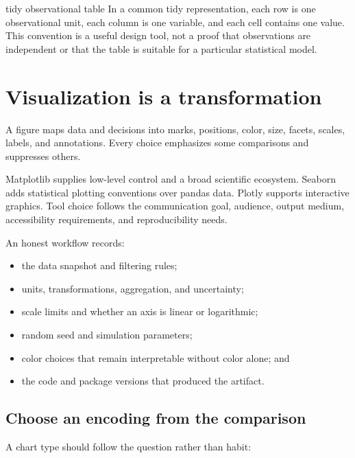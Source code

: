 \begin{definitionbox}{tidy observational table}
In a common tidy representation, each row is one observational unit, each
column is one variable, and each cell contains one value. This convention is a
useful design tool, not a proof that observations are independent or that the
table is suitable for a particular statistical model.
\end{definitionbox}

\section{Visualization is a transformation}

A figure maps data and decisions into marks, positions, color, size, facets,
scales, labels, and annotations. Every choice emphasizes some comparisons and
suppresses others.

Matplotlib supplies low-level control and a broad scientific ecosystem. Seaborn
adds statistical plotting conventions over pandas data. Plotly supports
interactive graphics. Tool choice follows the communication goal, audience,
output medium, accessibility requirements, and reproducibility needs.

An honest workflow records:

\begin{itemize}
  \item the data snapshot and filtering rules;
  \item units, transformations, aggregation, and uncertainty;
  \item scale limits and whether an axis is linear or logarithmic;
  \item random seed and simulation parameters;
  \item color choices that remain interpretable without color alone; and
  \item the code and package versions that produced the artifact.
\end{itemize}

\subsection*{Choose an encoding from the comparison}

A chart type should follow the question rather than habit:

